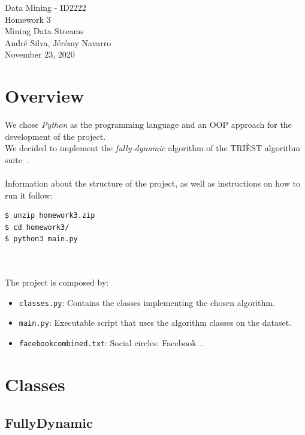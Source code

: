 \documentclass[]{article}
\begin{document}
\begin{center}
  {\large Data Mining - ID2222}\\
  \vspace{7mm}
  {\huge Homework 3\\[1ex]}
  {\Large  Mining Data Streams }\\
  \vspace{7mm}  
  {André Silva, Jérémy Navarro\\}
  \vspace{4mm}
  {\large November 23, 2020\\}
\end{center}

\section{Overview}

We chose \textit{Python} as the programming language and an \textsc{OOP} approach for the development of the project.\\
We decided to implement the \textit{fully-dynamic} algorithm of the TRIÈST algorithm suite~\cite{triest}.\\
\\
Information about the structure of the project, as well as instructions on how to run it follow:

\begin{lstlisting}[language=bash]
$ unzip homework3.zip
$ cd homework3/
$ python3 main.py
\end{lstlisting}\\
\\
The project is composed by:

\begin{itemize}
    \item \texttt{classes.py}: Contains the classes implementing the chosen algorithm.
    \item \texttt{main.py}: Executable script that uses the algorithm classes on the dataset.
    \item \texttt{facebook\textunderscore combined.txt}: Social circles: Facebook~\cite{facebook}.
\end{itemize}

\section{Classes}

\subsection{FullyDynamic}
\end{document}
